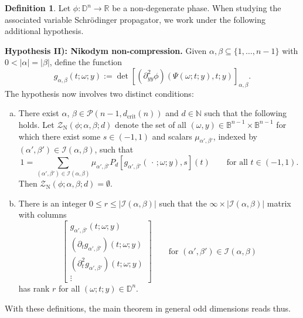 \documentclass[reqno]{amsart}
\numberwithin{equation}{section}
\newcommand{\B}{\mathbb{B}}
\newcommand{\D}{\mathbb{D}}
\newcommand{\N}{\mathbb{N}}
\newcommand{\R}{\mathbb{R}}
\newcommand{\cI}{\mathcal{I}}
\newcommand{\cP}{\mathcal{P}}
\newcommand{\cZ}{\mathcal{Z}}
\theoremstyle{plain}
\theoremstyle{definition}
\newtheorem{definition}[theorem]{Definition}
\newcommand{\crit}{\mathrm{crit}}
\begin{document}
\begin{definition}\label{dfn: lin comb N}  Let $\phi \colon \D^n \to \R$ be a non-degenerate phase. When studying the associated variable Schr\"odinger propagator, we work under the following additional hypothesis.\medskip

\noindent \textbf{Hypothesis II): Nikodym non-compression.} Given $\alpha, \beta \subseteq \{1, \dots, n-1\}$ with $0 < |\alpha| = |\beta|$, define the function
\begin{equation*} 
    g_{\alpha, \beta}(t; \omega; y) := \det[(\partial_{yy}^2 \phi)(\Psi(\omega; t; y),t;y)]_{\alpha, \beta}.
\end{equation*}
The hypothesis now involves two distinct conditions:
\begin{enumerate}[a)]
    \item There exist $\alpha$, $\beta \in \cP(n-1, d_{\crit}(n))$ and $d \in \N$ such that the following holds. Let $\cZ_{\mathrm{N}}(\phi;\alpha, \beta; d)$ denote the set of all $(\omega, y) \in \B^{n-1} \times \B^{n-1}$ for which there exist some $s \in (-1,1)$ and scalars $\mu_{\alpha',\beta'}$, indexed by $(\alpha', \beta') \in \cI(\alpha,\beta)$, such that
   \begin{equation*}
    1 = \sum_{(\alpha', \beta') \in \cI(\alpha,\beta)} \mu_{\alpha', \beta'} P_d[g_{\alpha', \beta'}(\,\cdot\,; \omega; y), s](t) \qquad \textrm{for all $t \in (-1,1)$.}
\end{equation*} 
Then $\cZ_{\mathrm{N}}(\phi; \alpha, \beta; d) = \emptyset$.
\item There is an integer $0 \leq r \leq |\cI(\alpha,\beta)|$ such that the $\infty \times |\cI(\alpha,\beta)|$ matrix with columns
\begin{equation*}
 \begin{bmatrix}
         g_{\alpha', \beta'} (t; \omega ;y)  \\
        (\partial_t g_{\alpha', \beta'}) (t; \omega ;y) \\
        (\partial_t^2 g_{\alpha', \beta'}) (t; \omega ;y) \\
        \vdots 
    \end{bmatrix} \qquad \textrm{for $(\alpha', \beta') \in \cI(\alpha,\beta)$}
\end{equation*}
has rank $r$ for all $(\omega;t;y) \in \D^n$. 
\end{enumerate}
\end{definition}

With these definitions, the main theorem in general odd dimensions reads thus. 
\end{document}
